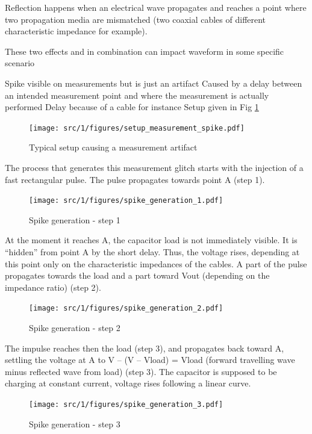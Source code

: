 Reflection happens when an electrical wave propagates and reaches a point where two propagation media are mismatched (two coaxial cables of different characteristic impedance for example).

These two effects and in combination can impact waveform in some specific scenario

Spike visible on measurements but is just an artifact
Caused by a delay between an intended measurement point and where the measurement is actually performed
Delay because of a cable for instance
Setup given in Fig \ref{fig:setup-measurement-spike}

\begin{figure}[!h]
  \centering
  \texttt{[image: src/1/figures/setup\_measurement\_spike.pdf]}
  \caption{Typical setup causing a measurement artifact}
  \label{fig:setup-measurement-spike}
\end{figure}

The process that generates this measurement glitch starts with the injection of a fast rectangular pulse.
The pulse propagates towards point A (step 1).

\begin{figure}[!h]
  \centering
  \texttt{[image: src/1/figures/spike\_generation\_1.pdf]}
  \caption{Spike generation - step 1}
  \label{fig:spike-step-1}
\end{figure}

At the moment it reaches A, the capacitor load is not immediately visible.
It is “hidden” from point A by the short delay.
Thus, the voltage rises, depending at this point only on the characteristic impedances of the cables.
A part of the pulse propagates towards the load and a part toward Vout (depending on the impedance ratio) (step 2).

\begin{figure}[!h]
  \centering
  \texttt{[image: src/1/figures/spike\_generation\_2.pdf]}
  \caption{Spike generation - step 2}
  \label{fig:spike-step-2}
\end{figure}

The impulse reaches then the load (step 3), and propagates back toward A, settling the voltage at A to
V – (V – Vload) = Vload (forward travelling wave minus reflected wave from load) (step 3).
The capacitor is supposed to be charging at constant current, voltage rises following a linear curve.

\begin{figure}[!h]
  \centering
  \texttt{[image: src/1/figures/spike\_generation\_3.pdf]}
  \caption{Spike generation - step 3}
  \label{fig:spike-step-3}
\end{figure}

